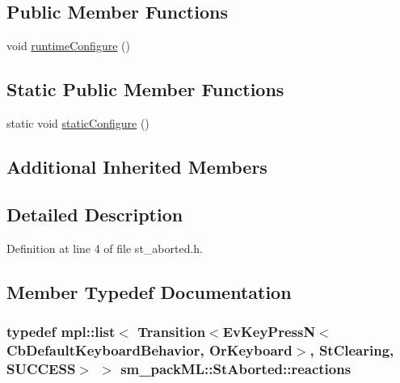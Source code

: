 \subsection*{Public Member Functions}
\begin{DoxyCompactItemize}
\item 
void \hyperlink{structsm__packML_1_1StAborted_ac10c7a9d4b4e58196324d1cbbbe3497a}{runtime\+Configure} ()
\end{DoxyCompactItemize}
\subsection*{Static Public Member Functions}
\begin{DoxyCompactItemize}
\item 
static void \hyperlink{structsm__packML_1_1StAborted_ad9fe492ea5bd5c903ffba9ed612a084d}{static\+Configure} ()
\end{DoxyCompactItemize}
\subsection*{Additional Inherited Members}


\subsection{Detailed Description}


Definition at line 4 of file st\+\_\+aborted.\+h.



\subsection{Member Typedef Documentation}
\subsubsection[{\texorpdfstring{reactions}{reactions}}]{\setlength{\rightskip}{0pt plus 5cm}typedef mpl\+::list$<$ Transition$<$Ev\+Key\+PressN$<$Cb\+Default\+Keyboard\+Behavior, {\bf Or\+Keyboard}$>$, {\bf St\+Clearing}, {\bf S\+U\+C\+C\+E\+SS}$>$ $>$ {\bf sm\+\_\+pack\+M\+L\+::\+St\+Aborted\+::reactions}}\hypertarget{structsm__packML_1_1StAborted_a0f84557ee52843d034a9672c0741bc89}{}\label{structsm__packML_1_1StAborted_a0f84557ee52843d034a9672c0741bc89}


